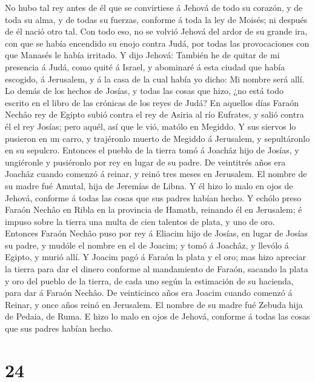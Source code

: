  No hubo tal rey antes de él que se convirtiese á Jehová de
todo su corazón, y de toda su alma, y de todas su fuerzas, conforme á
toda la ley de Moisés; ni después de él nació otro tal. 
Con todo eso, no se volvió Jehová del ardor de su grande ira, con que se
había encendido su enojo contra Judá, por todas las provocaciones con
que Manasés le había irritado.  Y dijo Jehová: También he
de quitar de mi presencia á Judá, como quité á Israel, y abominaré á
esta ciudad que había escogido, á Jerusalem, y á la casa de la cual
había yo dicho: Mi nombre será allí.  Lo demás de los
hechos de Josías, y todas las cosas que hizo, ¿no está todo escrito en
el libro de las crónicas de los reyes de Judá?  En aquellos
días Faraón Nechâo rey de Egipto subió contra el rey de Asiria al río
Eufrates, y salió contra él el rey Josías; pero aquél, así que le vió,
matólo en Megiddo.  Y sus siervos lo pusieron en un carro,
y trajéronlo muerto de Megiddo á Jerusalem, y sepultáronlo en su
sepulcro. Entonces el pueblo de la tierra tomó á Joachâz hijo de Josías,
y ungiéronle y pusiéronlo por rey en lugar de su padre.  De
veintitrés años era Joachâz cuando comenzó á reinar, y reinó tres meses
en Jerusalem. El nombre de su madre fué Amutal, hija de Jeremías de
Libna.  Y él hizo lo malo en ojos de Jehová, conforme á
todas las cosas que sus padres habían hecho.  Y echólo
preso Faraón Nechâo en Ribla en la provincia de Hamath, reinando él en
Jerusalem; é impuso sobre la tierra una multa de cien talentos de plata,
y uno de oro.  Entonces Faraón Nechâo puso por rey á
Eliacim hijo de Josías, en lugar de Josías su padre, y mudóle el nombre
en el de Joacim; y tomó á Joachâz, y llevólo á Egipto, y murió allí.
 Y Joacim pagó á Faraón la plata y el oro; mas hizo
apreciar la tierra para dar el dinero conforme al mandamiento de Faraón,
sacando la plata y oro del pueblo de la tierra, de cada uno según la
estimación de su hacienda, para dar á Faraón Nechâo.  De
veinticinco años era Joacim cuando comenzó á Reinar, y once años reinó
en Jerusalem. El nombre de su madre fué Zebuda hija de Pedaia, de Ruma.
 E hizo lo malo en ojos de Jehová, conforme á todas las
cosas que sus padres habían hecho.

\hypertarget{section-23}{%
\section{24}\label{section-23}}

